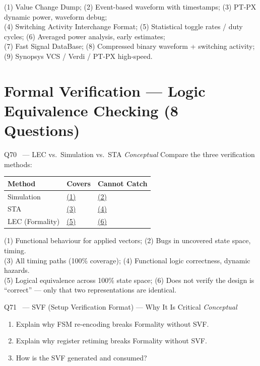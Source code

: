 \documentclass[12pt,a4paper]{article}
\newcommand{\advanced}{%
  \fbox{\textcolor{advred}{\bfseries\sffamily\small ADVANCED}}}
\newcommand{\moderate}{%
  \fbox{\textcolor{modoran}{\bfseries\sffamily\small MODERATE}}}
\begin{document}
\begin{answerbox}
(1) Value Change Dump; (2) Event-based waveform with timestamps; (3) PT-PX dynamic power, waveform debug;\\
(4) Switching Activity Interchange Format; (5) Statistical toggle rates / duty cycles; (6) Averaged power analysis, early estimates;\\
(7) Fast Signal DataBase; (8) Compressed binary waveform + switching activity; (9) Synopsys VCS / Verdi / PT-PX high-speed.
\end{answerbox}

\section{Formal Verification --- Logic Equivalence Checking (8 Questions)}
\label{sec:formal}

\begin{questionbox}{Q70 \moderate\ --- LEC vs.\ Simulation vs.\ STA \hfill\textit{Conceptual}}
Compare the three verification methods:

\begin{center}
\begin{tabular}{|l|l|l|}
\hline
\rowcolor{dkblue!15}
\textbf{Method} & \textbf{Covers} & \textbf{Cannot Catch}\\
\hline
Simulation & \underline{(1)} & \underline{(2)}\\
\hline
STA & \underline{(3)} & \underline{(4)}\\
\hline
LEC (Formality) & \underline{(5)} & \underline{(6)}\\
\hline
\end{tabular}
\end{center}
\end{questionbox}

\begin{answerbox}
(1) Functional behaviour for applied vectors; (2) Bugs in uncovered state space, timing.\\
(3) All timing paths (100\% coverage); (4) Functional logic correctness, dynamic hazards.\\
(5) Logical equivalence across 100\% state space; (6) Does not verify the design is ``correct'' --- only that two representations are identical.
\end{answerbox}

\begin{questionbox}{Q71 \advanced\ --- SVF (Setup Verification Format) --- Why It Is Critical \hfill\textit{Conceptual}}
\begin{enumerate}[label=\textbf{\alph*)}]
  \item Explain why FSM re-encoding breaks Formality without SVF.
  \item Explain why register retiming breaks Formality without SVF.
  \item How is the SVF generated and consumed?
\end{enumerate}
\end{questionbox}
\end{document}
